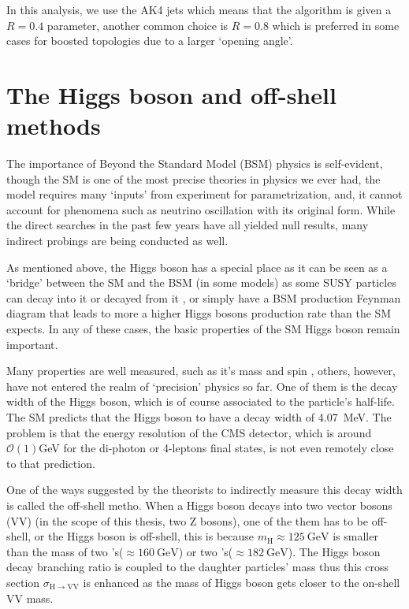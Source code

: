 In this analysis, we use the AK4 jets which means that the algorithm is given a $R=0.4$ parameter, another
common choice is $R=0.8$ which is preferred in some cases for boosted topologies due to a larger `opening
angle'.

\section{The Higgs boson and off-shell methods}\label{sec:physics_offshell}

The importance of Beyond the Standard Model (BSM) physics is self-evident, though the SM is one
of the most precise theories in physics we ever had, the model requires many `inputs' from experiment
for parametrization, and, it cannot account for phenomena such as neutrino oscillation with its
original form. While the direct searches in the past few years have all yielded null results,
many indirect probings are being conducted as well.

As mentioned above, the Higgs boson has a special place as it can be seen as a `bridge' between
the SM and the BSM (in some models) as some SUSY particles can decay into it or decayed from it
, or simply have a BSM production Feynman diagram that leads to more a higher Higgs
bosons production rate than the SM expects. In any of these cases, the basic properties of the SM Higgs
boson remain important.

Many properties are well measured, such as it's mass and spin \cite{higgs_papers}, others, however,
have not entered the realm of `precision' physics so far. One of them is the decay width of
the Higgs boson, which is of course associated to the particle's half-life. The SM predicts
that the Higgs boson to have a decay width of \SI{4.07}{\mega\electronvolt}. The problem is
that the energy resolution of the CMS detector, which is around $\mathcal{O}(1)$\si{\giga\electronvolt}
for the di-photon or 4-leptons final states, is not even remotely close to that prediction.

One of the ways suggested by the theorists to indirectly measure this decay width is called the
off-shell metho. When a Higgs boson decays into two vector bosons (VV) (in the scope of this thesis, two Z bosons),
one of the them has to be off-shell, or the Higgs boson is off-shell, this is because
$m_\text{H}\approx\SI{125}{\giga\electronvolt}$ is smaller than the 
mass of two \PW{}'s($\approx\SI{160}{\giga\electronvolt}$) 
or two \PZ{}'s($\approx\SI{182}{\giga\electronvolt}$). The Higgs boson decay branching ratio
is coupled to the daughter particles' mass thus this cross section
$\sigma_{\mathrm{H}\rightarrow\mathrm{VV}}$ is enhanced as the mass of Higgs boson gets closer to 
the on-shell VV mass.  

